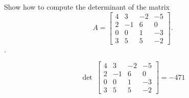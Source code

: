 
\begin{exerciseStatement}


Show how to compute the determinant of the matrix \[A= \left[\begin{array}{cccc}
4 & 3 & -2 & -5 \\
2 & -1 & 6 & 0 \\
0 & 0 & 1 & -3 \\
3 & 5 & 5 & -2
\end{array}\right] .\].


\end{exerciseStatement}
    
\begin{exerciseAnswer} 
\[\operatorname{det}\  \left[\begin{array}{cccc}
4 & 3 & -2 & -5 \\
2 & -1 & 6 & 0 \\
0 & 0 & 1 & -3 \\
3 & 5 & 5 & -2
\end{array}\right] = -471 \]
\end{exerciseAnswer}
    
